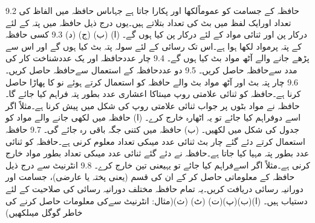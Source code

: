 9.2	حافظہ  کے جسامت کو عموماًلکھا اور پکارا جاتا ہے جہاںاس حافظہ میں الفاظ کی تعداد اورایک لفظ میں بٹ کی تعداد بتلاتے ہیں۔یوں درج ذیل حافظہ میں پتہ کے لئے درکار پن اور ثنائی مواد کے لئے درکار پن کیا ہوں گے۔ (ا) (ب) (ج) (د)
9.3	کسی حافظہ کے پتہ پرمواد لکھا ہوا ہے۔اس تک رسائی کے لئے سولہ پتہ بٹ کیا ہوں گے اور اس سے پڑھے جانے والے آٹھ مواد بٹ کیا ہوں گے۔
9.4	چار عددحافظہ اور یک عددشناخت کار کی مدد سےحافظہ حاصل کریں۔
9.5	دو عددحافظہ کے استعمال سےحافظہ حاصل کریں۔
9.6	چار پتہ بٹ اور آٹھ مواد بٹ والے حافظہ کو استعمال کرتے ہوئے نو کا پھاڑا حاصل کرنا ہے۔حافظہ کو ثنائی علامتی روپ میںتاکا اعشاری عدد بطور پتہ فراہم کیا جائے گا۔حافظہ نے مواد بٹوں پر جواب ثنائی علامتی روپ کی شکل میں پیش کرنا ہے۔مثلاً اگر اسے دوفراہم کیا جائے تو یہ اٹھارہ خارج کرے۔ (ا) حافظہ میں لکھی جانے والے مواد کو جدول کی شکل میں لکھیں۔ (ب) حافظہ میں کتنی جگہ باقی رہ جائے گی۔ 
9.7	حافظہ استعمال کرتے دئے گئے چار بٹ ثنائی عدد میںکی تعداد معلوم کرنی ہے۔حافظہ کو ثنائی عدد بطور پتہ مہیا کیا جاتا ہے۔حافظہ نے دئے گئے ثنائی عدد میںکی تعداد بطور مواد خارج کرنی ہے۔مثلاً اگر اسےفراہم کیا جائے تو یہیعنی تین خارج کرے۔
9.8	انٹرنیٹ سے درج ذیل حافظہ کے معلوماتی  حاصل کر کے ان کی قسم (یعنی پختہ یا عارضی)، جسامت اور دورانیہ رسائی دریافت کریں۔یہ تمام حافظہ مختلف دورانیہ رسائی کی صلاحیت کے لئے دستیاب ہیں۔ (ا)(ب)(پ)(ت)  (ٹ) (ث)(مثال: انٹرنیٹ سےکی معلومات حاصل کرنے کی خاطر گوگل میںلکھیں)
